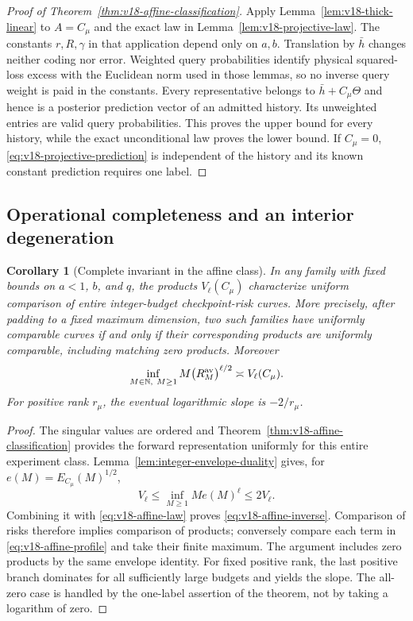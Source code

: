 \documentclass[11pt]{amsart}
\newtheorem{corollary}[theorem]{Corollary}
\theoremstyle{definition}\newtheorem{definition}[theorem]{Definition}
\theoremstyle{remark}\newtheorem{remark}[theorem]{Remark}
\begin{document}
\begin{proof}[Proof of Theorem~\ref{thm:v18-affine-classification}]
Apply Lemma~\ref{lem:v18-thick-linear} to $A=C_\mu$ and the exact law
in Lemma~\ref{lem:v18-projective-law}. The constants $r,R,\gamma$ in
that application depend only on $a,b$. Translation by $\bar h$ changes
neither coding nor error. Weighted query probabilities identify physical
squared-loss excess with the Euclidean norm used in those lemmas, so no
inverse query weight is paid in the constants. Every representative
belongs to $\bar h+C_\mu\Theta$ and hence is a posterior prediction
vector of an admitted history. Its unweighted entries are valid query
probabilities. This proves the upper bound for every history, while
the exact unconditional law proves the lower bound. If $C_\mu=0$,
\eqref{eq:v18-projective-prediction} is independent of the history and
its known constant prediction requires one label.
\end{proof}

\subsection{Operational completeness and an interior degeneration}
\begin{corollary}[Complete invariant in the affine class]
\label{cor:v18-affine-invariant}
In any family with fixed bounds on $a<1$, $b$, and $q$, the products
$V_\ell(C_\mu)$ characterize uniform comparison of entire integer-budget
checkpoint-risk curves. More precisely, after padding to a fixed maximum
dimension, two such families have uniformly comparable curves if and
only if their corresponding products are uniformly comparable,
including matching zero products. Moreover
\begin{equation}\label{eq:v18-affine-inverse}
 \inf_{M\in\mathbb N,\ M\ge1}M\bigl(R^{\mathrm{av}}_M\bigr)^{\ell/2}
 \asymp V_\ell(C_\mu).
\end{equation}
For positive rank $r_\mu$, the eventual logarithmic slope is $-2/r_\mu$.
\end{corollary}
\begin{proof}
The singular values are ordered and Theorem~\ref{thm:v18-affine-classification}
provides the forward representation uniformly for this entire experiment
class. Lemma~\ref{lem:integer-envelope-duality} gives, for
$e(M)=E_{C_\mu}(M)^{1/2}$,
\[
 V_\ell\le\inf_{M\ge1}Me(M)^\ell\le2V_\ell.
\]
Combining it with \eqref{eq:v18-affine-law} proves
\eqref{eq:v18-affine-inverse}. Comparison of risks therefore implies
comparison of products; conversely compare each term in
\eqref{eq:v18-affine-profile} and take their finite maximum.
The argument includes zero products by the same envelope identity.
For fixed positive rank, the last positive branch dominates for all
sufficiently large budgets and yields the slope. The all-zero case is
handled by the one-label assertion of the theorem, not by taking a
logarithm of zero.
\end{proof}
\end{document}
